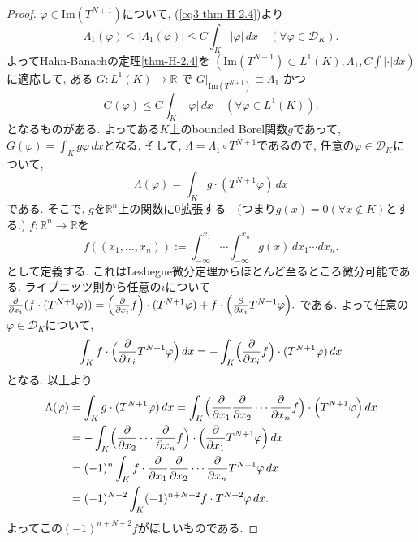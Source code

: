 \documentclass[dvipdfmx,a4paper,11pt]{article} %
\theoremstyle{definition}
\theoremstyle{remark}
\numberwithin{equation}{section}
\newcommand{\R}{\mathbb{R}}
\begin{document}
\begin{proof}
$\varphi \in \mathrm{Im}(T^{N+1}) $について, (\ref{eq3-thm-H-2.4})より
\[
\Lambda_1(\varphi) \leq |\Lambda_1(\varphi)| \leq C \int_K |\varphi| \, dx \quad (\forall \varphi \in \mathcal{D}_K).
\]
よってHahn-Banachの定理\ref{thm-H-2.4}を
\((\mathrm{Im}(T^{N+1}) \subset L^1(K), \Lambda_1, C \int |\cdot| dx)\)に適応して, 
ある \( G : L^1(K) \to \mathbb{R}\) で  \(G|_{\mathrm{Im}(T^{N+1})} \equiv \Lambda_1\) かつ
\[
G(\varphi) \leq C \int_K |\varphi| \, dx \quad (\forall \varphi \in L^1(K)).
\]
となるものがある. 
よってある$K$上のbounded Borel関数\(g \)であって, 
\(G(\varphi) = \int_K g\varphi \, dx \)となる. 
そして,  \(\Lambda = \Lambda_1 \circ T^{N+1}\)であるので, 任意の$\varphi \in \mathcal{D}_K$について, 
\[
\Lambda(\varphi)
 = \int_K g \cdot (T^{N+1}\varphi)\, dx
\]
である. 
そこで, $g$を$\R^n$上の関数に0拡張する　(つまり$g(x)=0 (\forall x \notin K)$とする.)
 \(f : \mathbb{R}^n \to \mathbb{R}\)を
\[
f((x_1,\ldots,x_n)) := \int_{-\infty}^{x_1}\cdots \int_{-\infty}^{x_n} g(x)\, dx_1 \cdots dx_n.
\]
として定義する. 
これはLesbegue微分定理からほとんど至るところ微分可能である. 
ライプニッツ則から任意の$i$について
\(\frac{\partial}{\partial x_i}(f \cdot (T^{N+1}\varphi)) 
= \Bigl(\frac{\partial}{\partial x_i} f\Bigr)\cdot (T^{N+1}\varphi) + f\cdot \Bigl(\frac{\partial}{\partial x_i} T^{N+1}\varphi\Bigr).\)
である. よって任意の\(\varphi \in \mathcal{D}_K\)について, 
\[ \int_K f\cdot \Bigl(\frac{\partial}{\partial x_i} T^{N+1}\varphi\Bigr)\, dx
= - \int_K \Bigl(\frac{\partial}{\partial x_i} f\Bigr)\cdot (T^{N+1}\varphi)\, dx
\]
となる. 以上より
\begin{align*}
\Lambda(\varphi) 
&= \int_K g \cdot (T^{N+1}\varphi)\, dx 
= \int_K \Bigl(\frac{\partial}{\partial x_1}\frac{\partial}{\partial x_2}\cdots \frac{\partial}{\partial x_n} f \Bigr) \cdot \Bigl( T^{N+1}\varphi\Bigr)\, dx \\
&= - \int_K \Bigl(\frac{\partial}{\partial x_2}\cdots \frac{\partial}{\partial x_n} f\Bigr)\cdot \Bigl(\frac{\partial}{\partial x_1} T^{N+1}\varphi\Bigr)\, dx \\
& = (-1)^n \int_K f\cdot \frac{\partial}{\partial x_1}\frac{\partial}{\partial x_2}\cdots \frac{\partial}{\partial x_n} T^{N+1}\varphi \, dx \\
&= (-1)^{N+2} \int_K (-1)^{n+N+2}f\cdot T^{N+2}\varphi \, dx.
\end{align*}
よってこの$(-1)^{n+N+2}f$がほしいものである. 
\end{proof}
\end{document}
